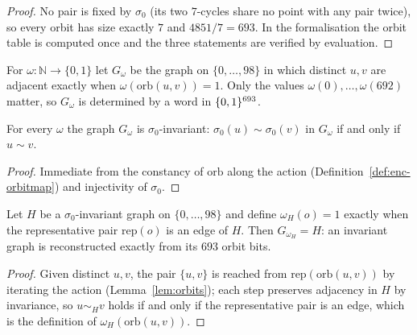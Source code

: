 \begin{proof}\leanok
No pair is fixed by $\sigma_0$ (its two $7$-cycles share no point with any
pair twice), so every orbit has size exactly $7$ and $4851/7 = 693$.  In the
formalisation the orbit table is computed once and the three statements are
verified by evaluation.
\end{proof}

\begin{definition}\label{def:enc-graphoforbits}
For $\omega \colon \mathbb{N} \to \{0,1\}$ let $G_\omega$ be the graph on
$\{0,\dots,98\}$ in which distinct $u, v$ are adjacent exactly when
$\omega(\mathrm{orb}(u,v)) = 1$.  Only the values $\omega(0),\dots,\omega(692)$
matter, so $G_\omega$ is determined by a word in $\{0,1\}^{693}$.
\leanok
{}
\end{definition}

\begin{lemma}\label{lem:enc-invariance}
For every $\omega$ the graph $G_\omega$ is $\sigma_0$-invariant:
$\sigma_0(u) \sim \sigma_0(v)$ in $G_\omega$ if and only if $u \sim v$.
\leanok
{}
\end{lemma}

\begin{proof}\leanok
Immediate from the constancy of $\mathrm{orb}$ along the action
(Definition~\ref{def:enc-orbitmap}) and injectivity of $\sigma_0$.
\end{proof}

\begin{lemma}\label{lem:enc-faithful}
Let $H$ be a $\sigma_0$-invariant graph on $\{0,\dots,98\}$ and define
$\omega_H(o) = 1$ exactly when the representative pair $\mathrm{rep}(o)$ is an
edge of $H$.  Then $G_{\omega_H} = H$: an invariant graph is reconstructed
exactly from its $693$ orbit bits.
\leanok
{}
\end{lemma}

\begin{proof}\leanok
Given distinct $u,v$, the pair $\{u,v\}$ is reached from
$\mathrm{rep}(\mathrm{orb}(u,v))$ by iterating the action
(Lemma~\ref{lem:orbits}); each step preserves adjacency in $H$ by invariance,
so $u \sim_H v$ holds if and only if the representative pair is an edge, which
is the definition of $\omega_H(\mathrm{orb}(u,v))$.
\end{proof}

